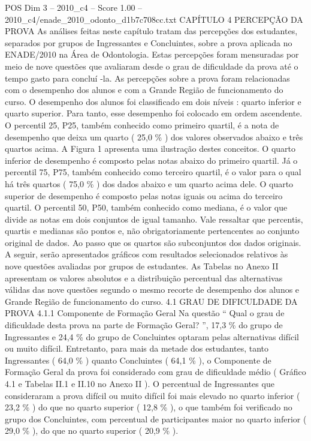 \begin{textsample}{POS Dim 3 – 2010\_c4 – Score 1.00 – 2010\_c4/enade\_2010\_odonto\_d1b7c708cc.txt}  \label{ex:f3_pos_149}
CAPÍTULO 4 PERCEPÇÃO DA PROVA As análises feitas neste capítulo tratam das percepções dos estudantes, separados por grupos de Ingressantes e Concluintes, sobre a prova aplicada no ENADE/2010 na Área de Odontologia.
Estas percepções foram mensuradas por meio de nove questões que avaliaram desde o grau de dificuldade da prova até o tempo gasto para concluí -la.
As percepções sobre a prova foram relacionadas com o desempenho dos alunos e com a Grande Região de funcionamento do curso.
O desempenho dos alunos foi classificado em dois níveis : quarto inferior e quarto superior.
Para tanto, esse desempenho foi colocado em ordem ascendente.
O percentil 25, P25, também conhecido como primeiro quartil, é a nota de desempenho que deixa um quarto ( 25,0 \% ) dos valores observados abaixo e três quartos acima.
A Figura 1 apresenta uma ilustração destes conceitos.
O quarto inferior de desempenho é composto pelas notas abaixo do primeiro quartil.
Já o percentil 75, P75, também conhecido como terceiro quartil, é o valor para o qual há três quartos ( 75,0 \% ) dos dados abaixo e um quarto acima dele.
O quarto superior de desempenho é composto pelas notas iguais ou acima do terceiro quartil.
O percentil 50, P50, também conhecido como mediana, é o valor que divide as notas em dois conjuntos de igual tamanho.
Vale ressaltar que percentis, quartis e medianas são pontos e, não obrigatoriamente pertencentes ao conjunto original de dados.
Ao passo que os quartos são subconjuntos dos dados originais.
A seguir, serão apresentados gráficos com resultados selecionados relativos às nove questões avaliadas por grupos de estudantes.
As Tabelas no Anexo II apresentam os valores absolutos e a distribuição percentual das alternativas válidas das nove questões segundo o mesmo recorte de desempenho dos alunos e Grande Região de funcionamento do curso. 4.1 GRAU DE DIFICULDADE DA PROVA 4.1.1 Componente de Formação Geral Na questão “ Qual o grau de dificuldade desta prova na parte de Formação Geral? ”, 17,3 \% do grupo de Ingressantes e 24,4 \% do grupo de Concluintes optaram pelas alternativas difícil ou muito difícil.
Entretanto, para mais da metade dos estudantes, tanto Ingressantes ( 64,0 \% ) quanto Concluintes ( 64,1 \% ), o Componente de Formação Geral da prova foi considerado com grau de dificuldade médio ( Gráfico 4.1 e Tabelas II.1 e II.10 no Anexo II ).
O percentual de Ingressantes que consideraram a prova difícil ou muito difícil foi mais elevado no quarto inferior ( 23,2 \% ) do que no quarto superior ( 12,8 \% ), o que também foi verificado no grupo dos Concluintes, com percentual de participantes maior no quarto inferior ( 29,0 \% ), do que no quarto superior ( 20,9 \% ).

\end{textsample}
